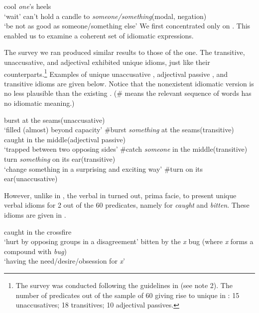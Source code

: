 \documentclass[output=paper,
modfonts
]{LSP/langsci}
\begin{document}
\ea \label{ex:horvath:3} 
	\ea \label{ex:horvath:3a} cool \emph{one}'s heels\\
	`wait'
	\ex \label{ex:horvath:3b} can't hold a candle to \emph{someone/something}\hfill(modal, negation)\\ `be not as good as someone/something else'
	\z
\z
We first concentrated only on . This enabled us to examine
a coherent set of idiomatic expressions.

The  survey we ran produced similar results to those of the
 one. The transitive, unaccusative, and adjectival 
exhibited unique idioms, just like their  counterparts.\footnote{The
 survey was conducted following the guidelines in \citet{horvath2009} (see note 2). The number of predicates out of the sample
of 60 giving rise to unique  in : 15
unaccusatives; 18 transitives; 10 adjectival passives.} Examples of
unique unaccusative , adjectival passive , and transitive 
idioms are given below. Notice that the nonexistent idiomatic version is
no less plausible than the existing . (\# means the relevant
sequence of words has no idiomatic meaning.)

\ea \label{ex:horvath:4}
	\ea \label{ex:horvath:4a} burst at the seams\hfill (unaccusative)\\
	`filled (almost) beyond capacity'
	\ex \label{ex:horvath:4b} \#burst \emph{something} at the seams\hfill (transitive)
	\z
\ex \label{ex:horvath:5} 
	\ea \label{ex:horvath:5a} caught in the middle\hfill (adjectival passive)\\
	`trapped between two opposing sides'
	\ex \label{ex:horvath:5b} \#catch \emph{someone} in the middle\hfill (transitive)
	\z
\ex \label{ex:horvath:6}
	\ea \label{ex:horvath:6a} turn \emph{something} on its ear\hfill (transitive)\\
	`change something in a surprising and exciting way'
	\ex \label{ex:horvath:6b} \#turn on its ear\hfill (unaccusative)
	\z
\z

However, unlike in , the verbal  in  turned out,
prima facie, to present unique verbal  idioms for 2 out of the 60
predicates, namely for \emph{caught} and \emph{bitten}. These idioms are
given in .

\ea \label{ex:horvath:7} 
	\ea \label{ex:horvath:7a} caught in the crossfire\\
	`hurt by opposing groups in a disagreement'
	\ex \label{ex:horvath:7b} bitten by the \emph{x} bug (where \emph{x} forms a compound with
\emph{bug})\\
	`having the need/desire/obsession for \emph{x}'
	\z
\z
\end{document}
